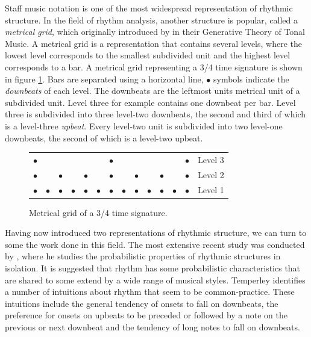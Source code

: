 Staff music notation is one of the most widespread representation of rhythmic structure. In the field of rhythm analysis, another structure is popular, called a \textit{metrical grid}, which originally introduced by \citet{lerdahl1983generative} in their Generative Theory of Tonal Music. A metrical grid is a representation that contains several levels, where the lowest level corresponds to the smallest subdivided unit and the highest level corresponds to a bar. A metrical grid representing a 3/4 time signature is shown in figure \ref{fig:grid}. Bars are separated using a horizontal line, $\bullet$ symbols indicate the \textit{downbeats} of each level. The downbeats are the leftmost units metrical unit of a subdivided unit. Level three for example contains one downbeat per bar. Level three is subdivided into three level-two downbeats, the second and third of which is a level-three \textit{upbeat}. Every level-two unit is subdivided into two level-one downbeats, the second of which is a level-two upbeat. 

\begin{figure}[b]
\centering
\hspace{2in}
\begin{tabular}{llllll|llllll|ll}
$\bullet$ &  &  &  &  &  & 		$\bullet$ &  &  &  &  &  & $\bullet$ & Level 3\\ 
$\bullet$ &  & 	$\bullet$ &  & 	$\bullet$ & & 	$\bullet$ & & $\bullet$ &  & $\bullet$ &  & $\bullet$ & Level 2\\
$\bullet$ & 		$\bullet$ & 		$\bullet$ & 		$\bullet$ & $\bullet$ & $\bullet$ & $\bullet$ & $\bullet$ & $\bullet$ & $\bullet$ & $\bullet$ & $\bullet$ & $\bullet$ & Level 1\\
\end{tabular}
\caption{Metrical grid of a 3/4 time signature.}
\label{fig:grid}
\end{figure}

Having now introduced two representations of rhythmic structure, we can turn to some the work done in this field. The most extensive recent study was conducted by \cite{temperley2010modeling}, where he studies the probabilistic properties of rhythmic structures in isolation. It is suggested that rhythm has some probabilistic characteristics that are shared to some extend by a wide range of musical styles. Temperley identifies a number of intuitions about rhythm that seem to be common-practice. These intuitions include the general tendency of onsets to fall on downbeats, the preference for onsets on upbeats to be preceded or followed by a note on the previous or next downbeat and the tendency of long notes to fall on downbeats. 

